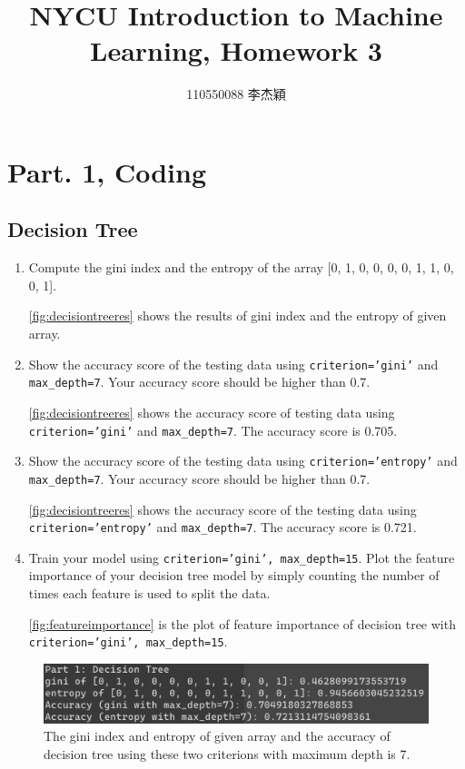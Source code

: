 \documentclass[twocolumn]{extarticle}
\title{NYCU Introduction to Machine Learning, Homework 3}
\author{110550088 李杰穎}
\date{}
\begin{document}
\maketitle

\section{Part. 1, Coding}
\subsection{Decision Tree}
\begin{enumerate}
\item Compute the gini index and the entropy of the array [0, 1, 0, 0, 0, 0, 1, 1, 0, 0, 1].

\autoref{fig:decisiontreeres} shows the results of gini index and the entropy of given array.

\item Show the accuracy score of the testing data using \texttt{criterion='gini'} and \texttt{max\_depth=7}. Your accuracy score should be higher than 0.7.

\autoref{fig:decisiontreeres} shows the accuracy score of testing data using \texttt{criterion='gini'} and \texttt{max\_depth=7}. The accuracy score is 0.705.

\item Show the accuracy score of the testing data using \texttt{criterion='entropy'} and \texttt{max\_depth=7}. Your accuracy score should be higher than 0.7.

\autoref{fig:decisiontreeres} shows the accuracy score of the testing data using \texttt{criterion='entropy'} and \texttt{max\_depth=7}. The accuracy score is 0.721.

\item Train your model using \texttt{criterion='gini', max\_depth=15}. Plot the feature importance of your decision tree model by simply counting the number of times each feature is used to split the data. 

\autoref{fig:featureimportance} is the plot of feature importance of decision tree with \texttt{criterion='gini', max\_depth=15}.

\end{enumerate}

\begin{figure}[H]
\centering
\includegraphics[width=0.95\linewidth]{decision_tree_res}
\caption{The gini index and entropy of given array and the accuracy of decision tree using these two criterions with maximum depth is 7.}
\label{fig:decisiontreeres}
\end{figure}
\end{document}
